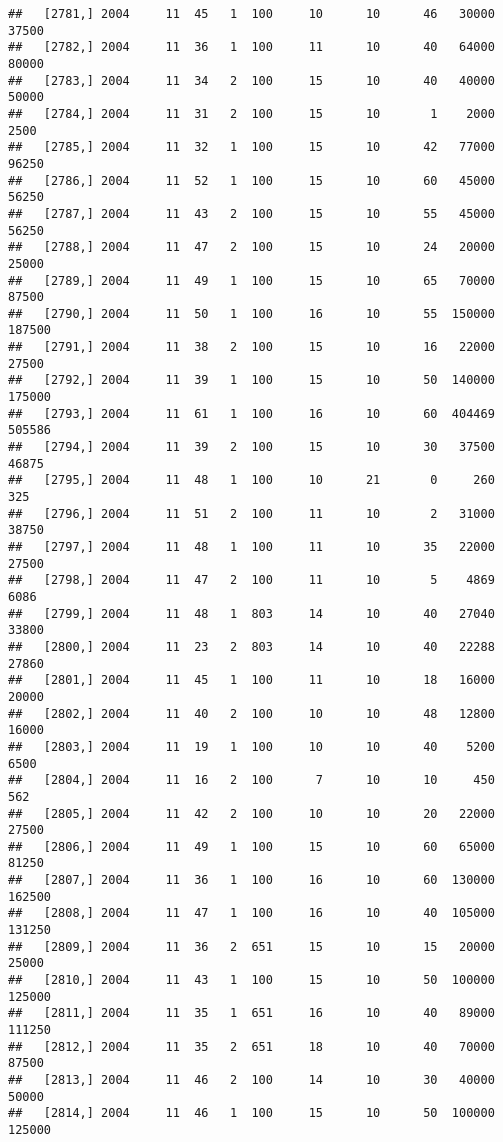 \documentclass{article}\usepackage[]{graphicx}\usepackage[]{color}
\makeatletter
\newenvironment{kframe}{%
 \def\at@end@of@kframe{}%
 \ifinner\ifhmode%
  \def\at@end@of@kframe{\end{minipage}}%
  \begin{minipage}{\columnwidth}%
 \fi\fi%
 \def\FrameCommand##1{\hskip\@totalleftmargin \hskip-\fboxsep
 \colorbox{shadecolor}{##1}\hskip-\fboxsep
     \hskip-\linewidth \hskip-\@totalleftmargin \hskip\columnwidth}%
 \MakeFramed {\advance\hsize-\width
   \@totalleftmargin\z@ \linewidth\hsize
   \@setminipage}}%
 {\par\unskip\endMakeFramed%
 \at@end@of@kframe}
\newenvironment{knitrout}{}{} %
\makeatother
\begin{document}
\begin{knitrout}
\begin{kframe}
\begin{verbatim}
##   [2781,] 2004     11  45   1  100     10      10      46   30000   37500
##   [2782,] 2004     11  36   1  100     11      10      40   64000   80000
##   [2783,] 2004     11  34   2  100     15      10      40   40000   50000
##   [2784,] 2004     11  31   2  100     15      10       1    2000    2500
##   [2785,] 2004     11  32   1  100     15      10      42   77000   96250
##   [2786,] 2004     11  52   1  100     15      10      60   45000   56250
##   [2787,] 2004     11  43   2  100     15      10      55   45000   56250
##   [2788,] 2004     11  47   2  100     15      10      24   20000   25000
##   [2789,] 2004     11  49   1  100     15      10      65   70000   87500
##   [2790,] 2004     11  50   1  100     16      10      55  150000  187500
##   [2791,] 2004     11  38   2  100     15      10      16   22000   27500
##   [2792,] 2004     11  39   1  100     15      10      50  140000  175000
##   [2793,] 2004     11  61   1  100     16      10      60  404469  505586
##   [2794,] 2004     11  39   2  100     15      10      30   37500   46875
##   [2795,] 2004     11  48   1  100     10      21       0     260     325
##   [2796,] 2004     11  51   2  100     11      10       2   31000   38750
##   [2797,] 2004     11  48   1  100     11      10      35   22000   27500
##   [2798,] 2004     11  47   2  100     11      10       5    4869    6086
##   [2799,] 2004     11  48   1  803     14      10      40   27040   33800
##   [2800,] 2004     11  23   2  803     14      10      40   22288   27860
##   [2801,] 2004     11  45   1  100     11      10      18   16000   20000
##   [2802,] 2004     11  40   2  100     10      10      48   12800   16000
##   [2803,] 2004     11  19   1  100     10      10      40    5200    6500
##   [2804,] 2004     11  16   2  100      7      10      10     450     562
##   [2805,] 2004     11  42   2  100     10      10      20   22000   27500
##   [2806,] 2004     11  49   1  100     15      10      60   65000   81250
##   [2807,] 2004     11  36   1  100     16      10      60  130000  162500
##   [2808,] 2004     11  47   1  100     16      10      40  105000  131250
##   [2809,] 2004     11  36   2  651     15      10      15   20000   25000
##   [2810,] 2004     11  43   1  100     15      10      50  100000  125000
##   [2811,] 2004     11  35   1  651     16      10      40   89000  111250
##   [2812,] 2004     11  35   2  651     18      10      40   70000   87500
##   [2813,] 2004     11  46   2  100     14      10      30   40000   50000
##   [2814,] 2004     11  46   1  100     15      10      50  100000  125000

\end{verbatim}
\end{kframe}
\end{knitrout}
\end{document}
